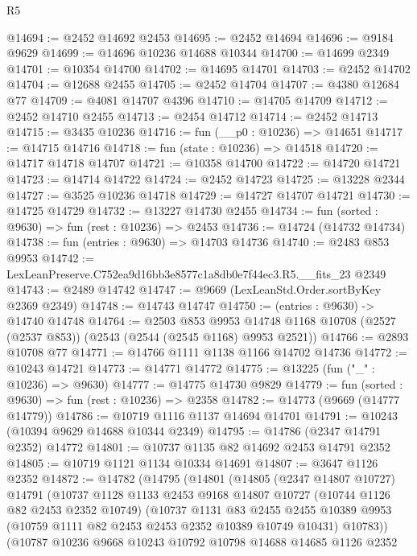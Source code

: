 \begin{lexlean}{R5}
\begin{coremodule}
@14694 := @2452 @14692 @2453
@14695 := @2452 @14694
@14696 := @9184 @9629
@14699 := @14696 @10236 @14688 @10344
@14700 := @14699 @2349
@14701 := @10354 @14700
@14702 := @14695 @14701
@14703 := @2452 @14702
@14704 := @12688 @2455
@14705 := @2452 @14704
@14707 := @4380 @12684 @77
@14709 := @4081 @14707 @4396
@14710 := @14705 @14709
@14712 := @2452 @14710 @2455
@14713 := @2454 @14712
@14714 := @2452 @14713
@14715 := @3435 @10236
@14716 := fun (__p0 : @10236) => @14651
@14717 := @14715 @14716
@14718 := fun (state : @10236) => @14518
@14720 := @14717 @14718 @14707
@14721 := @10358 @14700
@14722 := @14720 @14721
@14723 := @14714 @14722
@14724 := @2452 @14723
@14725 := @13228 @2344
@14727 := @3525 @10236 @14718
@14729 := @14727 @14707 @14721
@14730 := @14725 @14729
@14732 := @13227 @14730 @2455
@14734 := fun (sorted : @9630) => fun (rest : @10236) => @2453
@14736 := @14724 (@14732 @14734)
@14738 := fun (entries : @9630) => @14703 @14736
@14740 := @2483 @853 @9953
@14742 := LexLeanPreserve.C752ea9d16bb3e8577c1a8db0e7f44ec3.R5.__fits_23 @2349
@14743 := @2489 @14742
@14747 := @9669 (LexLeanStd.Order.sortByKey @2369 @2349)
@14748 := @14743 @14747
@14750 := (entries : @9630) -> @14740 @14748
@14764 := @2503
    @853
    @9953
    @14748
    @1168
    @10708
    (@2527 (@2537 @853))
    (@2543 (@2544 (@2545 @1168) @9953 @2521))
@14766 := @2893 @10708 @77
@14771 := @14766 @1111 @1138 @1166 @14702 @14736
@14772 := @10243 @14721
@14773 := @14771 @14772
@14775 := @13225 (fun ("_" : @10236) => @9630)
@14777 := @14775 @14730 @9829
@14779 := fun (sorted : @9630) => fun (rest : @10236) => @2358
@14782 := @14773 (@9669 (@14777 @14779))
@14786 := @10719 @1116 @1137 @14694 @14701
@14791 := @10243 (@10394 @9629 @14688 @10344 @2349)
@14795 := @14786 (@2347 @14791 @2352) @14772
@14801 := @10737 @1135 @82 @14692 @2453 @14791 @2352
@14805 := @10719 @1121 @1134 @10334 @14691
@14807 := @3647 @1126 @2352
@14872 := @14782
    (@14795
      (@14801
        (@14805
          (@2347 @14807 @10727)
          @14791
          (@10737
            @1128
            @1133
            @2453
            @9168
            @14807
            @10727
            (@10744 @1126 @82 @2453 @2352 @10749)
            (@10737
              @1131
              @83
              @2455
              @2455
              @10389
              @9953
              (@10759 @1111 @82 @2453 @2453 @2352 @10389 @10749 @10431)
              @10783))
          (@10787
            @10236
            @9668
            @10243
            @10792
            @10798
            @14688
            @14685
            @1126
            @2352

\end{coremodule}
\end{lexlean}
